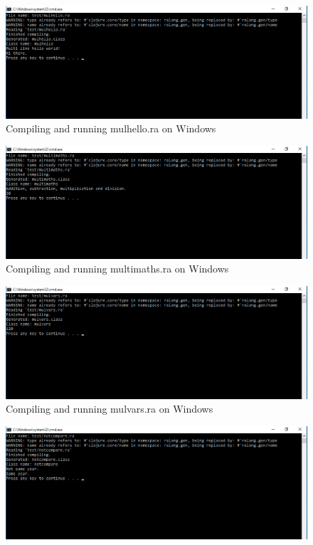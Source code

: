 \documentclass[a4paper]{article}
\begin{document}
\begin{appendices}
\begin{figure}[h!]
		\includegraphics[width=\linewidth]{images/windows_mulhello.png}
		\caption[Compiling and running mulhello.ra on Windows 10 32-bit]{Compiling and running mulhello.ra on Windows}
		\label{fig:windows_mulhello}
	\end{figure}
	\begin{figure}[h!]
		\centering
		\includegraphics[width=\linewidth]{images/windows_multimaths.png}
		\caption[Compiling and running multimaths.ra on Windows 10 32-bit]{Compiling and running multimaths.ra on Windows}
		\label{fig:windows_multimaths}
	\end{figure}
	\begin{figure}[h!]
		\centering
		\includegraphics[width=\linewidth]{images/windows_mulvars.png}
		\caption[Compiling and running mulvars.ra on Windows 10 32-bit]{Compiling and running mulvars.ra on Windows}
		\label{fig:windows_mulvars}
	\end{figure}
	\newpage
	\begin{figure}[h!]
		\centering
		\includegraphics[width=\linewidth]{images/windows_notcompare.png}

\end{figure}
\end{appendices}
\end{document}
